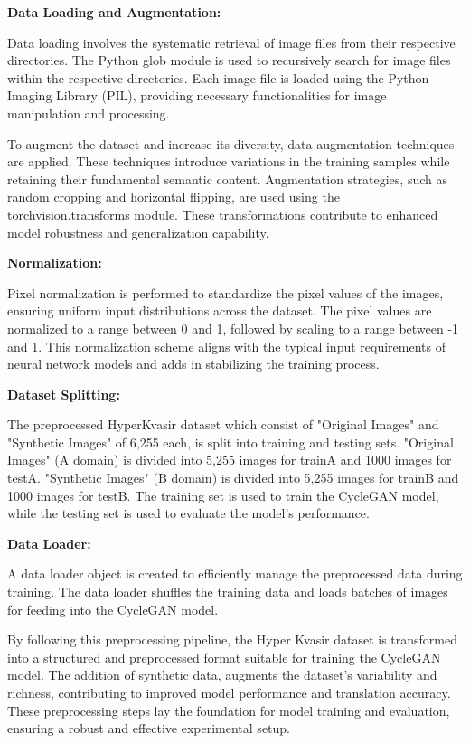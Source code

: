 \documentclass[UKenglish,12pt]{master-style}
\begin{document}
\textbf{{Data Loading and Augmentation:}}

Data loading involves the systematic retrieval of image files from their respective directories. The Python glob module is used to recursively search for image files within the respective directories. Each image file is loaded using the Python Imaging Library (PIL), providing necessary functionalities for image manipulation and processing.

To augment the dataset and increase its diversity, data augmentation techniques are applied. These techniques introduce variations in the training samples while retaining their fundamental semantic content.
Augmentation strategies, such as random cropping and horizontal flipping, are used using the torchvision.transforms module. These transformations contribute to enhanced model robustness and generalization capability.

\textbf{{Normalization:}}

Pixel normalization is performed to standardize the pixel values of the images, ensuring uniform input distributions across the dataset. The pixel values are normalized to a range between 0 and 1, followed by scaling to a range between -1 and 1. This normalization scheme aligns with the typical input requirements of neural network models and adds in stabilizing the training process.

\textbf{{Dataset Splitting:}}

The preprocessed HyperKvasir dataset which consist of "Original
Images" and "Synthetic Images" of 6,255 each, is split into training and testing sets. "Original Images" (A domain) is divided into 5,255 images for trainA and 1000 images for testA. "Synthetic Images" (B domain) is divided into 5,255 images for trainB and 1000 images for testB. The training set is used to train the CycleGAN model, while the testing set is used to evaluate the model's performance. 

\textbf{{Data Loader:}}

A data loader object is created to efficiently manage the preprocessed data during training. The data loader shuffles the training data and loads batches of images for feeding into the CycleGAN model.

By following this preprocessing pipeline, the Hyper Kvasir dataset is transformed into a structured and preprocessed format suitable for training the CycleGAN model. The addition of synthetic data, augments the dataset's variability and richness, contributing to improved model performance and translation accuracy. These preprocessing steps lay the foundation for model training and evaluation, ensuring a robust and effective experimental setup.
\end{document}
